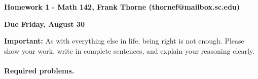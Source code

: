 \documentclass[12pt]{article}
\begin{document}
\setlength{\topmargin}{-2mm}





\begin{center}{\bf Homework 1 - Math 142, Frank Thorne (thornef@mailbox.sc.edu)}
\end{center}
\begin{center}
{\bf Due Friday, August 30}
\end{center}

{\bf Important:} As with everything else in life, being right is not enough.
Please show your work, write in complete sentences, and explain your reasoning clearly. 
\\
\\
{\bf Required problems.}
\end{document}
